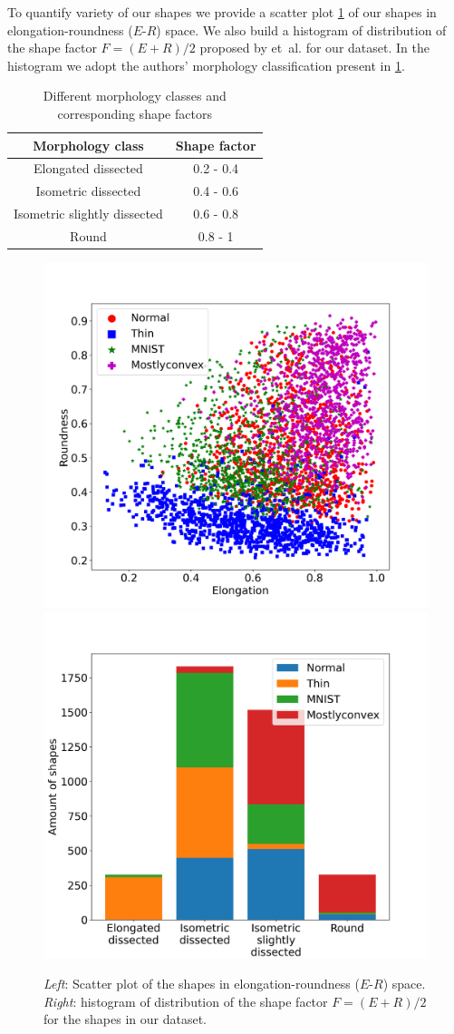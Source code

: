 \documentclass[reprint,amsmath,amssymb,aps,pre,showkeys,showpacs]{revtex4-1}
\newcommand{\highlight}[1]{{\color{red}{#1}}} %
\begin{document}
To quantify variety of our shapes we provide a scatter plot \cref{fig:e-r} of
our shapes in elongation-roundness ($E$-$R$) space. We also build a histogram of
distribution of the shape factor $F = (E+R)/2$ proposed by \highlight{Karsanina}
et~al.\cite{PLoS_ONE} for our dataset. In the histogram we adopt the authors'
morphology classification present in \cref{tab:morph-classes}.
\begin{table}[!htp]
  \centering
  \begin{tabular}{|c|c|}
    \hline
    Morphology class & Shape factor \\
    \hline
    Elongated dissected & 0.2 - 0.4 \\
    \hline
    Isometric dissected & 0.4 - 0.6 \\
    \hline
    Isometric slightly dissected & 0.6 - 0.8 \\
    \hline
    Round & 0.8 - 1 \\
    \hline
  \end{tabular}
  \caption{Different morphology classes and corresponding shape factors}
  \label{tab:morph-classes}
\end{table}

\begin{figure}[tp]
  \centering
  \includegraphics[width=0.45\linewidth]{images/roundness-elongation.png}
  \hfill
  \includegraphics[width=0.45\linewidth]{images/shape-factor.png}
  \caption[]{\textit{Left}: Scatter plot of the shapes in elongation-roundness
    ($E$-$R$) space. \textit{Right}: histogram of distribution of the shape
    factor $F = (E+R)/2$ for the shapes in our dataset.}
  \label{fig:e-r}
\end{figure}


\end{document}

